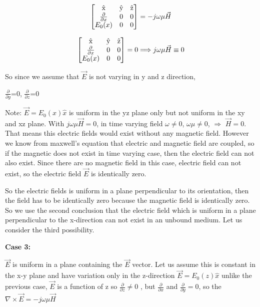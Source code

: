 		
		\[
		\begin{bmatrix}
			$\^{x}$ & $\^{y}$ & $\^{z}$\\
			$$\frac{\partial}{\partial x}$$ & 0 & 0\\
			$$E_{0}(x)$$ & 0 & 0
		\end{bmatrix} =
		-j\omega \mu \vec{H}
		\]
		
		

		
		\[
		\begin{bmatrix}
		$\^{x}$ & $\^{y}$ & $\^{z}$\\
		$$\frac{\partial}{\partial x}$$ & 0 & 0\\
		$$E_{0}(x)$$ & 0 & 0
		\end{bmatrix} =0 \Longrightarrow j\omega\mu\vec{H}\equiv0
		\]
		
		\bigskip
		
		So since we assume that $\vec{E}$ is not varying in y and z direction,
		
		\bigskip
		
		$\frac{\partial}{\partial y}$=0,
		$\frac{\partial}{\partial z}$=0
		
		\bigskip
		
		Note:  $\vec{E}={E_{0}(x)\hat{x}}$ is uniform in the yz plane only but not uniform in the xy and xz plane. With $j\omega\mu\vec{H}=0$, in time varying field $\omega\neq0$, $\omega\mu\neq0$, $\Longrightarrow$ $\vec{H}=0$. That means this electric fields would exist without any magnetic field. However we know from maxwell's equation that electric and magnetic field are coupled, so if the magnetic does not exist in time varying case, then the electric field can not also exist. Since there are no magnetic field in this case, electric field can not exist, so the electric field $\vec{E}$ is identically zero.
			
			\bigskip
			
			So the electric fields is uniform in a plane perpendicular to its orientation, then the field has to be identically zero because the magnetic field is identically zero. So we use the second conclusion that the electric field which is uniform in a plane perpendicular to the x-direction can not exist in an unbound medium. Let us consider the third possibility.
			
			\bigskip
			
			\textbf{Case 3:}
			
			\bigskip
			
			$\vec{E}$ is uniform in a plane containing the $\vec{E}$ vector. Let us assume this is constant in the x-y plane and have variation only in the z-direction $\vec{E}=E_{0}(z)\hat{x}$ unlike the previous case, $\vec{E}$ is a function of z so $\frac{\partial}{\partial z}\neq0$ , but  $\frac{\partial}{\partial x}$ and  $\frac{\partial}{\partial y}=0$, so the $\nabla\times\vec{E}=-j\omega\mu\vec{H}$
			
